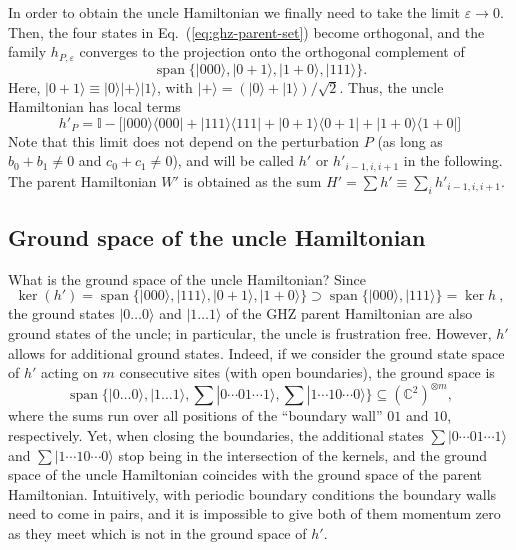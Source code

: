 \documentclass[cmp]{svjour}
\newcommand{\veps}{\varepsilon}
\newcommand{\C}{\mathbb{C}}
\newcommand{\I}{\mathbb{I}}
\DeclareMathOperator{\spann}{span}
\newcommand{\bra}[1]{\langle #1|}
\newcommand{\ket}[1]{|#1\rangle}
\DeclareMathOperator{\spanned}{span}
\begin{document}
In order to obtain the uncle Hamiltonian we finally need to take the limit
$\veps\rightarrow0$. Then, the four states in
Eq.~(\ref{eq:ghz-parent-set}) become orthogonal, and the family
$h_{P,\varepsilon}$ converges to the projection onto the orthogonal
complement of
\[
    \spanned\{\ket{000},\ket{0{+}1},\ket{1{+}0},\ket{111}\}.
\]
Here, $\ket{0\!+\!1}\equiv\ket0\ket+\ket1$, with
$\ket+=(\ket0+\ket1)/\sqrt2$.  Thus, the uncle Hamiltonian has local terms
\begin{equation} \label{eq:ghz-uncle}
    h'_P=\I-\big[\ket{000}\bra{000}+\ket{111}\bra{111}+\ket{0{+}1}\bra{0{+}1}
        +\ket{1{+}0}\bra{1{+}0}\big]
\end{equation}
Note that this limit does not depend on the perturbation $P$ (as long as
$b_0+b_1\neq 0$ and $c_0+c_1\neq 0$), and will be called $h'$ or
$h'_{i-1,i,i+1}$ in the following.  The parent Hamiltonian $W'$ is
obtained as the sum $H'=\sum h'\equiv\sum_i h'_{i-1,i,i+1}$.


\subsection{Ground space of the uncle Hamiltonian}

What is the ground space of the uncle Hamiltonian? Since
\[
    \ker(h')=\spann \{\ket{000},\ket{111},\ket{0+1},\ket{1+0}\}
    \supset
    \spann \{\ket{000},\ket{111}\}=\ker h\ ,
\]
the ground states $\ket{0\dots0}$ and $\ket{1\dots1}$ of the GHZ parent
Hamiltonian are also ground states of the uncle; in particular, the uncle
is frustration free. However, $h'$ allows for additional ground states.
Indeed, if we consider the ground state space of $h'$ acting on $m$
consecutive sites (with open boundaries), the ground space is
\begin{equation}
    \spanned \big\{ \ket{0\dots0}, \ket{1\dots 1}, \sum
    \ket{0\cdots 01\cdots 1}, \sum\ket{1\cdots 10\cdots
        0}\big\}\subseteq  (\C^2)^{\otimes m} ,
\end{equation}
where the sums run over all positions of the ``boundary wall'' $01$ and
$10$, respectively. Yet, when closing the boundaries,  the additional
states $\sum\ket{0\cdots 01\cdots 1}$ and $\sum\ket{1\cdots 10\cdots 0}$
stop being in the intersection of the kernels, and the ground space of the
uncle Hamiltonian coincides with the ground space of the parent
Hamiltonian. Intuitively, with periodic boundary conditions the boundary
walls need to come in pairs, and it is impossible to give both of them
momentum zero as they meet which is not in the ground space of $h'$.
\end{document}
